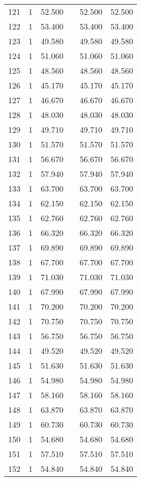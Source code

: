 \begin{table}[!htbp]
\begin{tabular}{@{\extracolsep{5pt}}lccccc}
121 & 1 & 52.500 &  & 52.500 & 52.500 \\ 
122 & 1 & 53.400 &  & 53.400 & 53.400 \\ 
123 & 1 & 49.580 &  & 49.580 & 49.580 \\ 
124 & 1 & 51.060 &  & 51.060 & 51.060 \\ 
125 & 1 & 48.560 &  & 48.560 & 48.560 \\ 
126 & 1 & 45.170 &  & 45.170 & 45.170 \\ 
127 & 1 & 46.670 &  & 46.670 & 46.670 \\ 
128 & 1 & 48.030 &  & 48.030 & 48.030 \\ 
129 & 1 & 49.710 &  & 49.710 & 49.710 \\ 
130 & 1 & 51.570 &  & 51.570 & 51.570 \\ 
131 & 1 & 56.670 &  & 56.670 & 56.670 \\ 
132 & 1 & 57.940 &  & 57.940 & 57.940 \\ 
133 & 1 & 63.700 &  & 63.700 & 63.700 \\ 
134 & 1 & 62.150 &  & 62.150 & 62.150 \\ 
135 & 1 & 62.760 &  & 62.760 & 62.760 \\ 
136 & 1 & 66.320 &  & 66.320 & 66.320 \\ 
137 & 1 & 69.890 &  & 69.890 & 69.890 \\ 
138 & 1 & 67.700 &  & 67.700 & 67.700 \\ 
139 & 1 & 71.030 &  & 71.030 & 71.030 \\ 
140 & 1 & 67.990 &  & 67.990 & 67.990 \\ 
141 & 1 & 70.200 &  & 70.200 & 70.200 \\ 
142 & 1 & 70.750 &  & 70.750 & 70.750 \\ 
143 & 1 & 56.750 &  & 56.750 & 56.750 \\ 
144 & 1 & 49.520 &  & 49.520 & 49.520 \\ 
145 & 1 & 51.630 &  & 51.630 & 51.630 \\ 
146 & 1 & 54.980 &  & 54.980 & 54.980 \\ 
147 & 1 & 58.160 &  & 58.160 & 58.160 \\ 
148 & 1 & 63.870 &  & 63.870 & 63.870 \\ 
149 & 1 & 60.730 &  & 60.730 & 60.730 \\ 
150 & 1 & 54.680 &  & 54.680 & 54.680 \\ 
151 & 1 & 57.510 &  & 57.510 & 57.510 \\ 
152 & 1 & 54.840 &  & 54.840 & 54.840 \\ 

\end{tabular}
\end{table}
